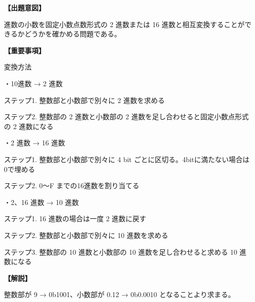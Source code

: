 \noindent \textbf{【出題意図】}

 進数の小数を固定小数点数形式の 2 進数または 16 進数と相互変換することができるかどうかを確かめる問題である。

\vspace{1em}
\noindent \textbf{【重要事項】}

\noindent 変換方法

\medskip
\noindent ・10進数 → 2 進数

\medskip
\noindent ステップ1. 整数部と小数部で別々に 2 進数を求める 

\noindent ステップ2. 整数部の 2 進数と小数部の 2 進数を足し合わせると固定小数点形式の 2 進数になる 

\medskip
\noindent ・2 進数 → 16 進数

\medskip
\noindent ステップ1. 整数部と小数部で別々に 4 bit ごとに区切る。4bitに満たない場合は0で埋める

\noindent ステップ2. 0〜F までの16進数を割り当てる


\medskip
\noindent ・2、16 進数 → 10 進数

\medskip
\noindent ステップ1. 16 進数の場合は一度 2 進数に戻す

\noindent ステップ2. 整数部と小数部で別々に 10 進数を求める 

\noindent ステップ3. 整数部の 10 進数と小数部の 10 進数を足し合わせると求める 10 進数になる 


\vspace{1em}
\noindent \textbf{【解説】}

\noindent 整数部が 9 → 0b1001、小数部が 0.12 → 0b0.0010 となることより求まる。
